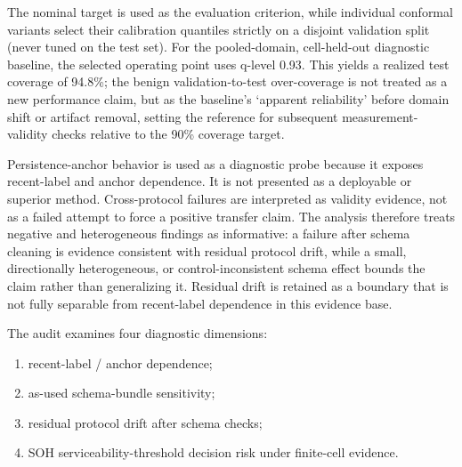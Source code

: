 \documentclass[
  number,
  preprint]{elsarticle}
\providecommand{\tightlist}{%
  \setlength{\itemsep}{0pt}\setlength{\parskip}{0pt}}
\begin{document}
The nominal target is used as the evaluation criterion, while individual
conformal variants select their calibration quantiles strictly on a
disjoint validation split (never tuned on the test set). For the
pooled-domain, cell-held-out diagnostic baseline, the selected operating
point uses q-level 0.93. This yields a realized test coverage of 94.8\%;
the benign validation-to-test over-coverage is not treated as a new
performance claim, but as the baseline's `apparent reliability' before
domain shift or artifact removal, setting the reference for subsequent
measurement-validity checks relative to the 90\% coverage target.

Persistence-anchor behavior is used as a diagnostic probe because it
exposes recent-label and anchor dependence. It is not presented as a
deployable or superior method. Cross-protocol failures are interpreted
as validity evidence, not as a failed attempt to force a positive
transfer claim. The analysis therefore treats negative and heterogeneous
findings as informative: a failure after schema cleaning is evidence
consistent with residual protocol drift, while a small, directionally
heterogeneous, or control-inconsistent schema effect bounds the claim
rather than generalizing it. Residual drift is retained as a boundary
that is not fully separable from recent-label dependence in this
evidence base.

The audit examines four diagnostic dimensions:

\begin{enumerate}
\def\labelenumi{\arabic{enumi}.}
\tightlist
\item
  recent-label / anchor dependence;
\item
  as-used schema-bundle sensitivity;
\item
  residual protocol drift after schema checks;
\item
  SOH serviceability-threshold decision risk under finite-cell evidence.
\end{enumerate}
\end{document}
